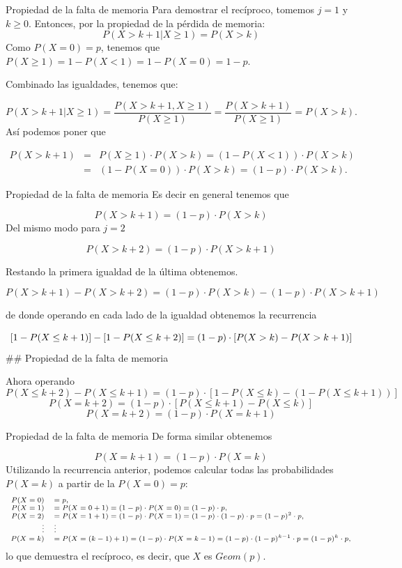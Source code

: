 \documentclass[
  ignorenonframetext,
  aspectratio=169]{beamer}
\begin{document}
\begin{frame}{Propiedad de la falta de memoria}
\protect\hypertarget{propiedad-de-la-falta-de-memoria-2}{}
Para demostrar el recíproco, tomemos \(j=1\) y \(k\geq 0\). Entonces,
por la propiedad de la pérdida de memoria: \[
P\left(X> k+1\big| X\geq 1\right)=P(X> k)
\] Como \(P(X=0)=p\), tenemos que
\(P(X \geq 1 )=1-P(X<1)=1-P(X=0)=1-p\).

Combinado las igualdades, tenemos que:

\[
P\left(X> k+1\big| X\geq 1\right)=\frac{P(X>k+1, X\geq 1)}{P(X\geq 1)}=\frac{P(X>k+1)}{P(X\geq 1)}=P(X>k).
\] Así podemos poner que

\begin{eqnarray*}
P(X>k+1)&=&P(X\geq 1)\cdot P(X>k)=\left(1-P(X<1)\right)\cdot P(X>k)\\
&=&\left(1-P(X=0)\right)\cdot P(X>k)=(1-p)\cdot P(X>k).
\end{eqnarray*}
\end{frame}

\begin{frame}{Propiedad de la falta de memoria}
\protect\hypertarget{propiedad-de-la-falta-de-memoria-3}{}
Es decir en general tenemos que

\[
P(X>k+1)=(1-p)\cdot P(X>k)
\] Del mismo modo para \(j=2\)

\[
P(X>k+2)=(1-p)\cdot P(X>k+1)
\]

Restando la primera igualdad de la última obtenemos.

\[
P(X>k+1)-P(X>k+2)=(1-p)\cdot P(X>k)-(1-p)\cdot P(X>k+1)
\]

de donde operando en cada lado de la igualdad obtenemos la recurrencia

\[
\scriptsize{[1-P(X\leq k+1)]-[1-P(X\leq k+2)]=(1-p)\cdot [P(X>k)-P(X>k+1)]}
\] \#\# Propiedad de la falta de memoria

Ahora operando \[
P(X\leq k+2)-P(X\leq k+1)=(1-p)\cdot[1-P(X\leq k)-\left(1-P(X\leq k+1)\right)]
\] \[
P(X=k+2)=(1-p)\cdot[P(X\leq k+1)-P(X\leq k)]
\] \[
P(X=k+2)=(1-p)\cdot P(X=k+1)
\]
\end{frame}

\begin{frame}{Propiedad de la falta de memoria}
\protect\hypertarget{propiedad-de-la-falta-de-memoria-4}{}
De forma similar obtenemos

\[
P(X=k+1)=(1-p)\cdot P(X=k)
\] Utilizando la recurrencia anterior, podemos calcular todas las
probabilidades \(P(X=k)\) a partir de la \(P(X=0)=p\): \[
\scriptsize{
\begin{array}{rl}
P(X=0)&= p,\\
P(X=1)&=P(X=0+1)= (1-p)\cdot P(X=0) =(1-p)\cdot  p,\\
P(X=2)&=P(X=1+1)= (1-p)\cdot P(X=1)=(1-p)\cdot (1-p)\cdot p=(1-p)^2\cdot p,\\
 \vdots &    \vdots \\
P(X=k)&=P(X=(k-1)+1)= (1-p)\cdot P(X=k-1)=(1-p)\cdot (1-p)^{k-1}\cdot p=(1-p)^{k}\cdot p,
\end{array}
}
\] lo que demuestra el recíproco, es decir, que \(X\) es \(Geom(p)\).
\end{frame}
\end{document}
